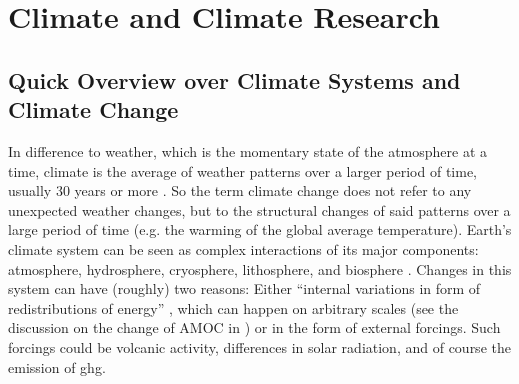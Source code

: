 \section{Climate and Climate Research}
\label{sec:climate}



\subsection{Quick Overview over Climate Systems and Climate Change}

%

In difference to weather, which is the momentary state of the atmosphere at a time, climate is the average of weather patterns over a larger period of time, usually 30 years or more \cite{noaa_whats_nodate}. 
So the term climate change does not refer to any unexpected weather changes, but to the structural changes of said patterns over a large period of time (e.g. the warming of the global average temperature). 
Earth's climate system can be seen as complex interactions of its major components: atmosphere, hydrosphere, cryosphere, lithosphere, and biosphere \cite{vietinghoffdiss, intergovernmental_panel_on_climate_change_ipcc_climate_2023}. 
Changes in this system can have (roughly) two reasons: 
Either \enquote{internal variations in form of redistributions of energy} \cite{vietinghoffdiss}, which can happen on arbitrary scales (see the discussion on the change of AMOC in \cite{lobelle_detectability_2020}) or in the form of external forcings. 
Such forcings could be volcanic activity, differences in solar radiation, and of course the emission of \ac{ghg}. 

